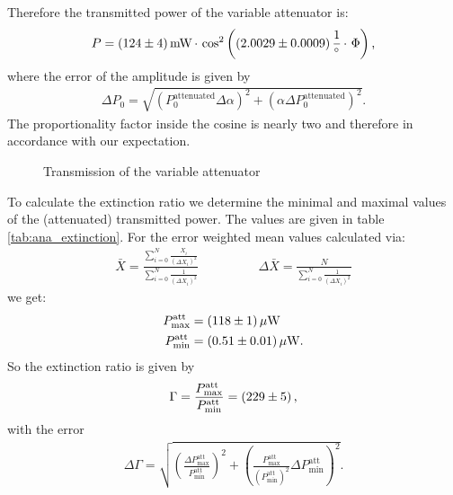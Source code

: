 \documentclass{protokoll_en}
\begin{document}
Therefore the transmitted power of the variable attenuator is:
\begin{align}
P = \unit[(124 \pm 4)]{mW}\,\cdotp\,\cos^2\left(\unit[(2.0029 \pm 0.0009)]{\frac{1}{^\circ}} \,\cdotp\, \Phi\right)\textrm{,}
\end{align}
where the error of the amplitude is given by
\begin{align}
\Delta P_0 = \sqrt{\left(P_0^\textrm{attenuated}\Delta \alpha\right)^2+\left(\alpha\Delta P_0^\textrm{attenuated}\right)^2}\textrm{.}
\end{align}
The proportionality factor inside the cosine is nearly two and therefore in accordance with our expectation.
\begin{figure}[H]
  \resizebox{0.8\textwidth}{!}{
     
}
  \caption{Transmission of the variable attenuator}
  \label{fig:ana_var_att}
\end{figure}
To calculate the extinction ratio we determine the minimal and maximal values of the (attenuated) transmitted power. The values are given in table \ref{tab:ana_extinction}. For the error weighted mean values calculated via:
\begin{align*}
\bar{X} = \frac{\sum_{i=0}^N \frac{X_i}{(\Delta X_i)^2}}{\sum_{i=0}^N \frac{1}{(\Delta X_i)^2}}\hspace{2cm} \Delta \bar{X} = \frac{N}{\sum_{i=0}^N \frac{1}{(\Delta X_i)^2}}
\end{align*}
we get:
\begin{align*}
P_\textrm{max}^\textrm{att}&=\unit[(118 \pm 1)]{\mu W}\\
P_\textrm{min}^\textrm{att}&=\unit[(0.51 \pm 0.01)]{\mu W}\textrm{.}
\end{align*}
So the extinction ratio is given by
\begin{align}
\Gamma=\frac{P_\textrm{max}^\textrm{att}}{P_\textrm{min}^\textrm{att}}=\unit[(229 \pm 5)]{}\textrm{,}
\end{align}
with the error
\begin{align*}
\Delta\Gamma=\sqrt{\left(\frac{\Delta P_\textrm{max}^\textrm{att}}{P_\textrm{min}^\textrm{att}}\right)^2+\left(\frac{ P_\textrm{max}^\textrm{att}}{\left(P_\textrm{min}^\textrm{att}\right)^2}\Delta P_\textrm{min}^\textrm{att}\right)^2}\textrm{.}
\end{align*}
\begin{table}[H]
  \centering
{}
\caption{Minimal and maximal transmitted power of the $\lambda / 2$ plate (attenuated)}
  \label{tab:ana_extinction}
\end{table}
\end{document}
